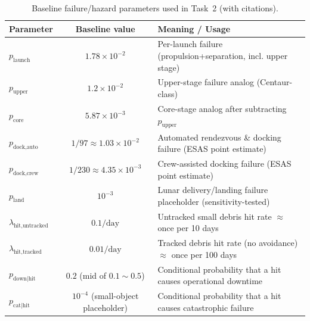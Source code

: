 ﻿\documentclass{mcmthesis}
\begin{document}
\begin{table}[htbp]
\centering
\caption{Baseline failure/hazard parameters used in Task~2 (with citations).}
\label{tab:baseline_params_task2}
\renewcommand{\arraystretch}{1.15}
\begin{tabularx}{\textwidth}{@{}l c >{\raggedright\arraybackslash}X@{}}
\toprule
\textbf{Parameter} & \textbf{Baseline value} & \textbf{Meaning / Usage} \\
\midrule
$p_{\text{launch}}$ & $1.78\times 10^{-2}$ &
Per-launch failure (propulsion+separation, incl. upper stage) \cite{nasa_launch_assembly_reliability_2013} \\
$p_{\text{upper}}$  & $1.2\times 10^{-2}$ &
Upper-stage failure analog (Centaur-class) \cite{nasa_launch_assembly_reliability_2013} \\
$p_{\text{core}}$   & $5.87\times 10^{-3}$ &
Core-stage analog after subtracting $p_{\text{upper}}$ \cite{nasa_launch_assembly_reliability_2013} \\
$p_{\text{dock,auto}}$ & $1/97 \approx 1.03\times 10^{-2}$ &
Automated rendezvous \& docking failure (ESAS point estimate) \cite{nasa_launch_assembly_reliability_2013} \\
$p_{\text{dock,crew}}$ & $1/230 \approx 4.35\times 10^{-3}$ &
Crew-assisted docking failure (ESAS point estimate) \cite{nasa_launch_assembly_reliability_2013} \\
$p_{\text{land}}$ & $10^{-3}$ &
Lunar delivery/landing failure placeholder (sensitivity-tested) \\
\midrule
$\lambda_{\text{hit,untracked}}$ & $0.1/\text{day}$ &
Untracked small debris hit rate $\approx$ once per 10 days \cite{isec_debris_2010} \\
$\lambda_{\text{hit,tracked}}$ & $0.01/\text{day}$ &
Tracked debris hit rate (no avoidance) $\approx$ once per 100 days \cite{isec_debris_2010} \\
$p_{\text{down}|\text{hit}}$ & $0.2$ (mid of $0.1\sim0.5$) &
Conditional probability that a hit causes operational downtime \\
$p_{\text{cat}|\text{hit}}$ & $10^{-4}$ (small-object placeholder) &
Conditional probability that a hit causes catastrophic failure \\
\bottomrule
\end{tabularx}
\end{table}
\end{document}
